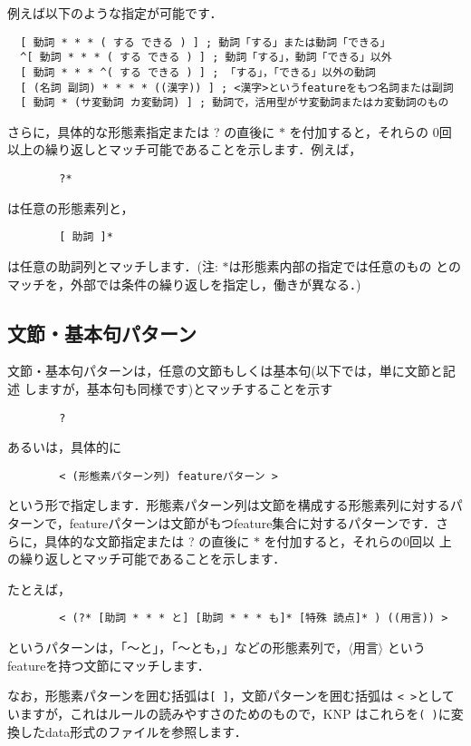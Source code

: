 \documentclass[a4j,11pt,titlepage]{jarticle}
\def\fl{$\langle$}
\def\fr{$\rangle$}
\begin{document}
例えば以下のような指定が可能です．
\begin{verbatim}
  [ 動詞 * * * ( する できる ) ] ; 動詞「する」または動詞「できる」
  ^[ 動詞 * * * ( する できる ) ] ; 動詞「する」，動詞「できる」以外 
  [ 動詞 * * * ^( する できる ) ] ; 「する」，「できる」以外の動詞
  [ (名詞 副詞) * * * * ((漢字)) ] ; <漢字>というfeatureをもつ名詞または副詞
  [ 動詞 * (サ変動詞 カ変動詞) ] ; 動詞で，活用型がサ変動詞またはカ変動詞のもの
\end{verbatim}

さらに，具体的な形態素指定または ? の直後に $*$ を付加すると，それらの
0回以上の繰り返しとマッチ可能であることを示します．例えば，
\begin{verbatim}
        ?*
\end{verbatim}
は任意の形態素列と，
\begin{verbatim}
        [ 助詞 ]*  
\end{verbatim}
は任意の助詞列とマッチします．(注: $*$は形態素内部の指定では任意のもの
とのマッチを，外部では条件の繰り返しを指定し，働きが異なる．)


\subsection{文節・基本句パターン}

文節・基本句パターンは，任意の文節もしくは基本句(以下では，単に文節と記述
しますが，基本句も同様です)とマッチすることを示す
\begin{verbatim}
        ?
\end{verbatim}
あるいは，具体的に

\begin{verbatim}
        < (形態素パターン列) featureパターン >
\end{verbatim}

という形で指定します．形態素パターン列は文節を構成する形態素列に対するパ
ターンで，featureパターンは文節がもつfeature集合に対するパターンです．さ
らに，具体的な文節指定または ? の直後に $*$ を付加すると，それらの0回以
上の繰り返しとマッチ可能であることを示します．

たとえば，
\begin{verbatim}
        < (?* [助詞 * * * と] [助詞 * * * も]* [特殊 読点]* ) ((用言)) >
\end{verbatim}
というパターンは，「〜と」，「〜とも，」などの形態素列で，\fl 用言\fr 
というfeatureを持つ文節にマッチします．

なお，形態素パターンを囲む括弧は\texttt{[ ]}，文節パターンを囲む括弧は
\texttt{< >}としていますが，これはルールの読みやすさのためのもので，KNP
はこれらを\texttt{( )}に変換したdata形式のファイルを参照します．
\end{document}
